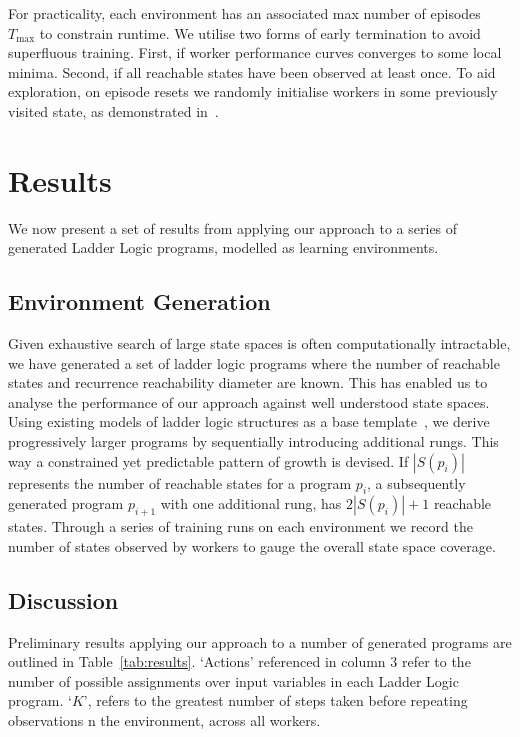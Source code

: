 \documentclass[runningheads]{llncs}
\begin{document}
For practicality, each environment has an associated max number of episodes $T_{\max}$ to constrain runtime. We utilise two forms of early termination to avoid superfluous training. First, if worker performance curves converges to some local minima. Second, if all reachable states have been observed at least once. To aid exploration, on episode resets we randomly initialise workers in some previously visited state, as demonstrated in~\cite{gordillo2021improving}. 


\section{Results}
We now present a set of results from applying our approach to a series of generated Ladder Logic programs, modelled as learning environments. 
\subsection{Environment Generation}

Given exhaustive search of large state spaces is often computationally intractable, we have generated a set of ladder logic programs where the number of reachable states and recurrence reachability diameter are known. This has enabled us to analyse the performance of our approach against well understood state spaces. Using existing models of ladder logic structures as a base template~\cite{james2013verification}, we derive progressively larger programs by sequentially introducing additional rungs. This way a constrained yet predictable pattern of growth is devised. If $|S(p_i)|$ represents the number of reachable states for a program $p_i$, a subsequently generated program $p_{i+1}$ with one additional rung, has $2|S(p_i)|+1$ reachable states. Through a series of training runs on each environment we record the number of states observed by workers to gauge the overall state space coverage. 


\subsection{Discussion}
Preliminary results applying our approach to a number of generated programs are outlined in Table~\ref{tab:results}. `Actions' referenced in column 3 refer to the number of possible assignments over input variables in each Ladder Logic program. `$K$', refers to the greatest number of steps taken before repeating observations n the environment, across all workers.
\end{document}
